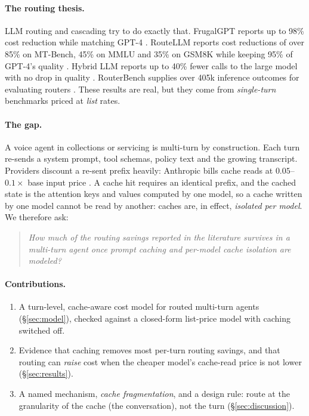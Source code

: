 \documentclass[10pt]{article}
\begin{document}
\paragraph{The routing thesis.} LLM routing and cascading try to do exactly that. FrugalGPT reports up to 98\% cost reduction while matching GPT-4 \cite{chen2023frugalgpt}. RouteLLM reports cost reductions of over 85\% on MT-Bench, 45\% on MMLU and 35\% on GSM8K while keeping 95\% of GPT-4's quality \cite{ong2024routellm,lmsys2024routellm}. Hybrid LLM reports up to 40\% fewer calls to the large model with no drop in quality \cite{ding2024hybrid}. RouterBench supplies over 405k inference outcomes for evaluating routers \cite{hu2024routerbench}. These results are real, but they come from \emph{single-turn} benchmarks priced at \emph{list} rates.

\paragraph{The gap.} A voice agent in collections or servicing is multi-turn by construction. Each turn re-sends a system prompt, tool schemas, policy text and the growing transcript. Providers discount a re-sent prefix heavily: Anthropic bills cache reads at $0.05$--$0.1\times$ base input price \cite{anthropiccache}. A cache hit requires an identical prefix, and the cached state is the attention keys and values computed by one model, so a cache written by one model cannot be read by another: caches are, in effect, \emph{isolated per model}. We therefore ask:
\begin{quote}\itshape
How much of the routing savings reported in the literature survives in a multi-turn agent once prompt caching and per-model cache isolation are modeled?
\end{quote}

\paragraph{Contributions.}
\begin{enumerate}[leftmargin=*,itemsep=1pt]
\item A turn-level, cache-aware cost model for routed multi-turn agents (\S\ref{sec:model}), checked against a closed-form list-price model with caching switched off.
\item Evidence that caching removes most per-turn routing savings, and that routing can \emph{raise} cost when the cheaper model's cache-read price is not lower (\S\ref{sec:results}).
\item A named mechanism, \emph{cache fragmentation}, and a design rule: route at the granularity of the cache (the conversation), not the turn (\S\ref{sec:discussion}).
\end{enumerate}
\end{document}
